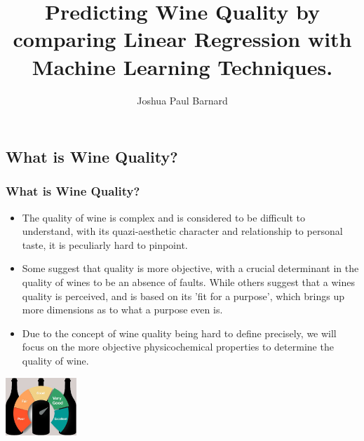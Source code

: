 \documentclass{beamer}
\author{Joshua Paul Barnard}
\title{Predicting Wine Quality by comparing Linear Regression with Machine Learning Techniques.}
\date{\vspace{-5em}}
\begin{document}
	{
		\begin{frame}
			\vspace{-35pt}
			\maketitle
		\end{frame}
	}

	\section{}

	\subsection{What is Wine Quality?}
	\begin{frame}
		\frametitle{What is Wine Quality?}
			\begin{itemize}
				\item The quality of wine is complex and is considered to be difficult to understand, with its quazi-aesthetic character and relationship to personal taste, it is peculiarly hard to pinpoint.  
				\item Some suggest that quality is more objective, with a crucial determinant in the quality of wines to be an absence of faults.  While others suggest that a wines quality is perceived, and is based on its 'fit for a purpose', which brings up more dimensions as to what a purpose even is. 
				\item Due to the concept of wine quality being hard to define precisely, we will focus on the more objective physicochemical properties to determine the quality of wine.
			\end{itemize}
			\begin{center}
				\includegraphics[width = 0.2\textwidth]{images/quality-in-wine.png}
			\end{center}
	\end{frame}
\end{document}
